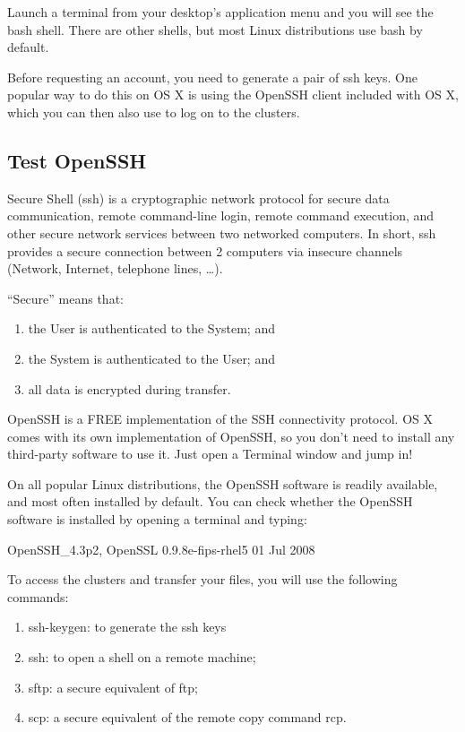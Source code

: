   Launch a terminal from your desktop’s application menu and you will see the bash shell.
  There are other shells, but most Linux distributions use bash by default.
\fi

\ifmacORlinux
  Before requesting an account, you need to generate a pair of ssh keys. One
  popular way to do this on OS X is using the OpenSSH client included with OS
  X, which you can then also use to log on to the clusters.

  \subsection{Test OpenSSH}
  \label{sec:test-openssh}

  Secure Shell (ssh) is a cryptographic network protocol for secure data
  communication, remote command-line login, remote command execution, and other
  secure network services between two networked computers. In short, ssh
  provides a secure connection between 2 computers via insecure channels
  (Network, Internet, telephone lines, \ldots).

  ``Secure'' means that:
  \begin{enumerate}
    \item  the User is authenticated to the System; and
    \item  the System is authenticated to the User; and
    \item  all data is encrypted during transfer.
  \end{enumerate}

  OpenSSH is a FREE implementation of the SSH connectivity protocol. OS X comes
  with its own implementation of OpenSSH, so you don't need to install any
  third-party software to use it. Just open a Terminal window and jump in!

  On all popular Linux distributions, the OpenSSH software is readily
  available, and most often installed by default. You can check whether the
  OpenSSH software is installed by opening a terminal and typing:

\begin{prompt}
OpenSSH_4.3p2, OpenSSL 0.9.8e-fips-rhel5 01 Jul 2008
\end{prompt}

  To access the clusters and transfer your files, you will use the following commands:

  \begin{enumerate}
    \item  ssh-keygen: to generate the ssh keys
    \item  ssh: to open a shell on a remote machine;
    \item  sftp: a secure equivalent of ftp;
    \item  scp: a secure equivalent of the remote copy command rcp.
  \end{enumerate}

